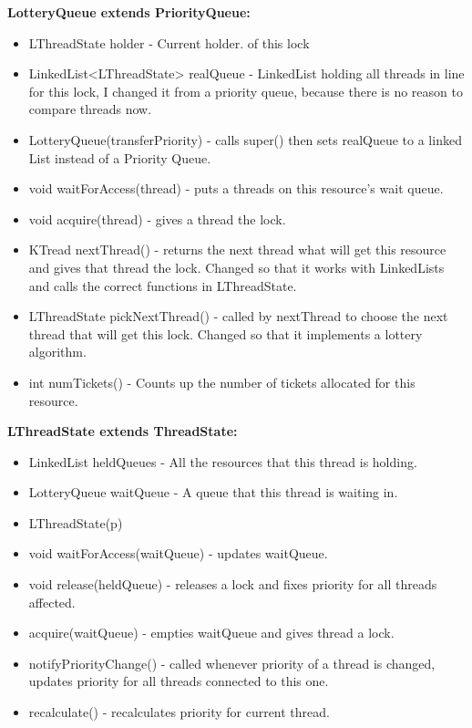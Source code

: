 \noindent\textbf{LotteryQueue extends PriorityQueue:} \begin{itemize}
\item {\ttfamily LThreadState holder} - Current holder. of this lock
\item {\ttfamily LinkedList<LThreadState> realQueue} - LinkedList holding all threads in line for this lock, I changed it from a priority queue, because there is no reason to compare threads now.
\item {\ttfamily LotteryQueue(transferPriority)} - calls super() then sets realQueue to a linked List instead of a Priority Queue.
\item {\ttfamily void waitForAccess(thread)} - puts a threads on this resource's wait queue.
\item {\ttfamily void acquire(thread)} - gives a thread the lock.
\item {\ttfamily KTread nextThread()} - returns the next thread what will get this resource and gives that thread the lock. Changed so that it works with LinkedLists and calls the correct functions in LThreadState.
\item {\ttfamily LThreadState pickNextThread()} - called by nextThread to choose the next thread that will get this lock. Changed so that it implements a lottery algorithm.
\item {\ttfamily int numTickets()} - Counts up the number of tickets allocated for this resource.
\end{itemize}

\noindent\textbf{LThreadState extends ThreadState:} \begin{itemize}
\item {\ttfamily LinkedList heldQueues}               - All the resources that this thread is holding.
\item {\ttfamily LotteryQueue waitQueue}              - A queue that this thread is waiting in.
\item {\ttfamily LThreadState(p)}                      
\item {\ttfamily void waitForAccess(waitQueue)}       - updates waitQueue.
\item {\ttfamily void release(heldQueue)}              - releases a lock and fixes priority for all threads affected.
\item {\ttfamily acquire(waitQueue)}                  - empties waitQueue and gives thread a lock.
\item {\ttfamily notifyPriorityChange()}              - called whenever priority of a thread is changed, updates priority for all threads connected to this one.
\item {\ttfamily recalculate()}                       - recalculates priority for current thread.
\end{itemize}

